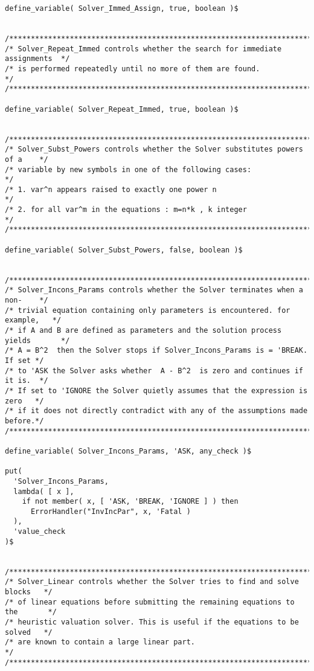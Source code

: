 \begin{verbatim}
define_variable( Solver_Immed_Assign, true, boolean )$


/******************************************************************************/
/* Solver_Repeat_Immed controls whether the search for immediate assignments  */
/* is performed repeatedly until no more of them are found.                   */
/******************************************************************************/

define_variable( Solver_Repeat_Immed, true, boolean )$


/******************************************************************************/
/* Solver_Subst_Powers controls whether the Solver substitutes powers of a    */
/* variable by new symbols in one of the following cases:                     */
/* 1. var^n appears raised to exactly one power n                             */
/* 2. for all var^m in the equations : m=n*k , k integer                      */
/******************************************************************************/

define_variable( Solver_Subst_Powers, false, boolean )$


/******************************************************************************/
/* Solver_Incons_Params controls whether the Solver terminates when a non-    */
/* trivial equation containing only parameters is encountered. for example,   */
/* if A and B are defined as parameters and the solution process yields       */
/* A = B^2  then the Solver stops if Solver_Incons_Params is = 'BREAK. If set */
/* to 'ASK the Solver asks whether  A - B^2  is zero and continues if it is.  */
/* If set to 'IGNORE the Solver quietly assumes that the expression is zero   */
/* if it does not directly contradict with any of the assumptions made before.*/
/******************************************************************************/

define_variable( Solver_Incons_Params, 'ASK, any_check )$

put(
  'Solver_Incons_Params,
  lambda( [ x ],
    if not member( x, [ 'ASK, 'BREAK, 'IGNORE ] ) then
      ErrorHandler("InvIncPar", x, 'Fatal )
  ),
  'value_check
)$


/******************************************************************************/
/* Solver_Linear controls whether the Solver tries to find and solve blocks   */
/* of linear equations before submitting the remaining equations to the       */
/* heuristic valuation solver. This is useful if the equations to be solved   */
/* are known to contain a large linear part.                                  */
/******************************************************************************/


\end{verbatim}
